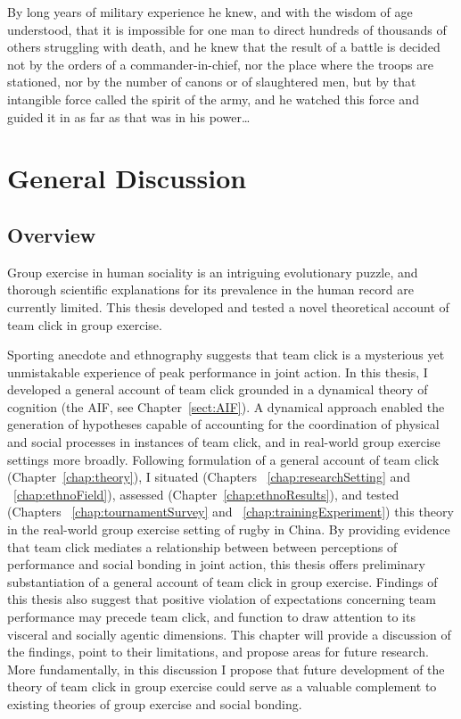 
\begin{savequote}[8cm]
By long years of military experience he knew, and with the wisdom of age understood, that it is impossible for one man to direct hundreds of thousands of others struggling with death, and he knew that the result of a battle is decided not by the orders of a commander-in-chief, nor the place where the troops are stationed, nor by the number of canons or of slaughtered men, but by that intangible force called the spirit of the army, and he watched this force and guided it in as far as that was in his power\dots
\end{savequote}

\chapter{\label{chap:generalDiscussion}General Discussion}




\section{Overview}
Group exercise in human sociality is an intriguing evolutionary puzzle, and thorough scientific explanations for its prevalence in the human record are currently limited. This thesis developed and tested a novel theoretical account of team click in group exercise.

Sporting anecdote and ethnography suggests that team click is a mysterious yet unmistakable experience of peak performance in joint action.  In this thesis, I developed a general account of team click grounded in a dynamical theory of cognition (the AIF, see Chapter~\ref{sect:AIF}).  A dynamical approach enabled the generation of hypotheses capable of accounting for the coordination of physical and social processes in instances of team click, and in real-world group exercise settings more broadly.  Following formulation of a general account of team click (Chapter~\ref{chap:theory}), I situated (Chapters ~\ref{chap:researchSetting} and ~\ref{chap:ethnoField}), assessed (Chapter~\ref{chap:ethnoResults}), and tested (Chapters ~\ref{chap:tournamentSurvey} and ~\ref{chap:trainingExperiment}) this theory in the real-world group exercise setting of rugby in China.  By providing evidence that team click mediates a relationship between between perceptions of performance and social bonding in joint action, this thesis offers preliminary substantiation of a general account of team click in group exercise.  Findings of this thesis also suggest that positive violation of expectations concerning team performance may precede team click, and function to draw attention to its visceral and socially agentic dimensions.  This chapter will provide a discussion of the findings, point to their limitations, and propose areas for future research.  More fundamentally, in this discussion I propose that future development of the theory of team click in group exercise could serve as a valuable complement to existing theories of group exercise and social bonding.

